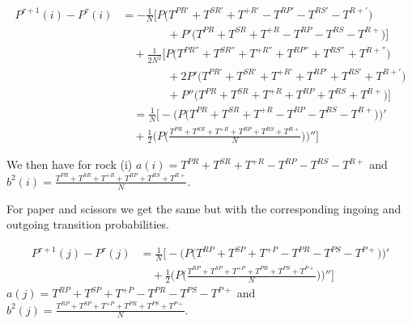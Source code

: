 \documentclass[./main.tex]{subfiles}
\begin{document}
\begin{equation}
\begin{aligned}
P^{\tau+1}(i)-P^\tau(i)
&= -\frac{1}{N}\Big[
      P\big(
          T^{PR'} + T^{SR'} + T^{+R'}
        - T^{RP'} - T^{RS'} - T^{R+'}
      \big)
\\
&\qquad\qquad
    + P'\big(
          T^{PR} + T^{SR} + T^{+R}
        - T^{RP} - T^{RS} - T^{R+}
      \big)
    \Big]
\\[6pt]
&\quad
 + \frac{1}{2N^2}\Big[
      P\big(T^{PR''}+T^{SR''}+T^{+R''} + T^{RP''} +T^{RS''}+T^{R+''} \big) \\
      &\qquad\qquad 
      + 2P'\big(T^{PR'}+T^{SR'}+T^{+R'}+T^{RP'} +T^{RS'}+T^{R+'} \big) \\
      &\qquad\qquad
      + P''\big(T^{PR}+T^{SR}+T^{+R}+T^{RP} +T^{RS}+T^{R+}\big)
    \Big]
\\
&\quad=\frac{1}{N}\Big[
    -\big(P\big(
          T^{PR} + T^{SR} + T^{+R}
        - T^{RP} - T^{RS} - T^{R+}
      \big)\big)'
\\[6pt]
&\quad
 + \frac{1}{2}\big(
      P\big(\frac{T^{PR}+T^{SR}+T^{+R} + T^{RP} +T^{RS}+T^{R+}}{N}\big)
    \big)'' \Big]
\end{aligned}
\end{equation}


\hfill

\noindent We then have for rock (i) $a(i) = T^{PR} + T^{SR} + T^{+R} - T^{RP} - T^{RS} - T^{R+}$ and $b^2(i) = \frac{T^{PR}+T^{SR}+T^{+R} + T^{RP} +T^{RS}+T^{R+}}{N}$. 

\hfill

\noindent For paper and scissors we get the same but with the corresponding ingoing and outgoing transition probabilities.

\hfill

\par \noindent
\begin{equation}
\begin{aligned}
P^{\tau+1}(j)-P^\tau(j)
&=\frac{1}{N}\Big[
    -\big(P\big(
          T^{RP} + T^{SP} + T^{+P}
        - T^{PR} - T^{PS} - T^{P+}
      \big)\big)'
\\[6pt]
&\quad
 + \frac{1}{2}\big(
      P\big(\frac{T^{RP}+T^{SP}+T^{+P} + T^{PR} +T^{PS}+T^{P+}}{N}\big)
    \big)'' \Big]
\end{aligned}
\end{equation}
$a(j) = T^{RP} + T^{SP} + T^{+P} - T^{PR} - T^{PS} - T^{P+}$ and $b^2(j) = \frac{T^{RP}+T^{SP}+T^{+P} + T^{PR} +T^{PS}+T^{P+}}{N}$. 
\end{document}
